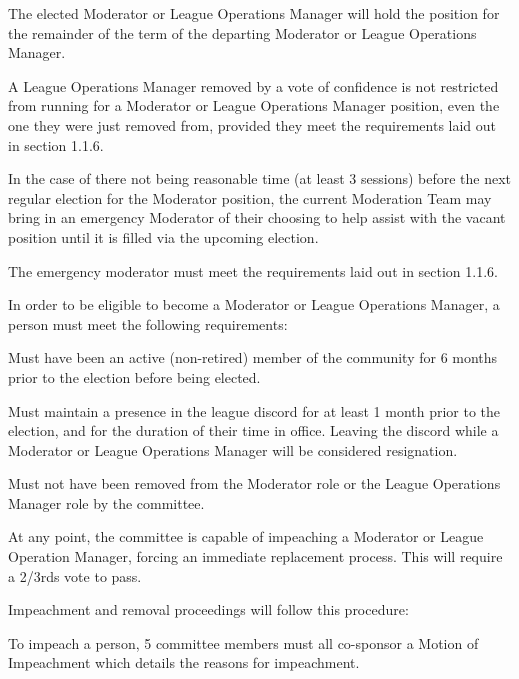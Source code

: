 \begin{deepEnumerate}
\begin{deepEnumerate}
		\item The elected Moderator or League Operations Manager will hold the position for the remainder of the term of the departing Moderator or League Operations Manager.
		\item A League Operations Manager removed by a vote of confidence is not restricted from running for a Moderator or League Operations Manager position,
		even the one they were just removed from, provided they meet the requirements laid out in section 1.1.6.
		\item In the case of there not being reasonable time (at least 3 sessions) before the next regular election for the Moderator position, the current Moderation Team may bring in an emergency Moderator of their choosing to help assist with the vacant position until it is filled via the upcoming election.
		\begin{deepEnumerate}
		\item The emergency moderator must meet the requirements laid out in section 1.1.6. 
		\end{deepEnumerate}
	\end{deepEnumerate}
	\item In order to be eligible to become a Moderator or League Operations Manager, a person must meet the following requirements:
	\begin{deepEnumerate}
		\item Must have been an active (non-retired) member of the community for 6 months prior to the election before being elected.
		\item Must maintain a presence in the league discord for at least 1 month prior to the election, and for the duration of their time in office. 
		Leaving the discord while a Moderator or League Operations Manager will be considered resignation.
		\item Must not have been removed from the Moderator role or the League Operations Manager role by the committee.	
	\end{deepEnumerate}
	\item At any point, the committee is capable of impeaching a Moderator or League Operation Manager, forcing an immediate replacement process.
	This will require a 2/3rds vote to pass.
	\begin{deepEnumerate}
		\item Impeachment and removal proceedings will follow this procedure:
		\begin{deepEnumerate}
			\item To impeach a person, 5 committee members must all co-sponsor a Motion of Impeachment which details the reasons for impeachment.

\end{deepEnumerate}
\end{deepEnumerate}
\end{deepEnumerate}
